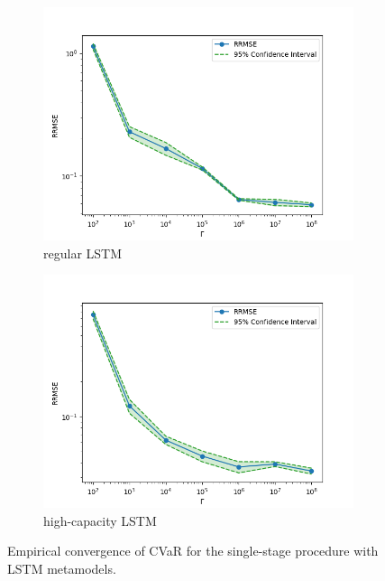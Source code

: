 \begin{figure}[ht!]
    \centering
    \begin{subfigure}{0.48\textwidth}
        \includegraphics[width=\textwidth]{./project2/figures/singleStage/MSEConvergence_lstmLoCap.png}
        \caption{regular LSTM}
        \label{subfig2:convLoCap}
    \end{subfigure}
    \begin{subfigure}{0.48\textwidth}
        \includegraphics[width=\textwidth]{./project2/figures/singleStage/MSEConvergence_lstmHiCap.png}
        \caption{high-capacity LSTM}
        \label{subfig2:convHiCap}
    \end{subfigure}
    \caption{Empirical convergence of CVaR for the single-stage procedure with LSTM metamodels.} 
    \label{fig2:gammaConvergence}
\end{figure}


